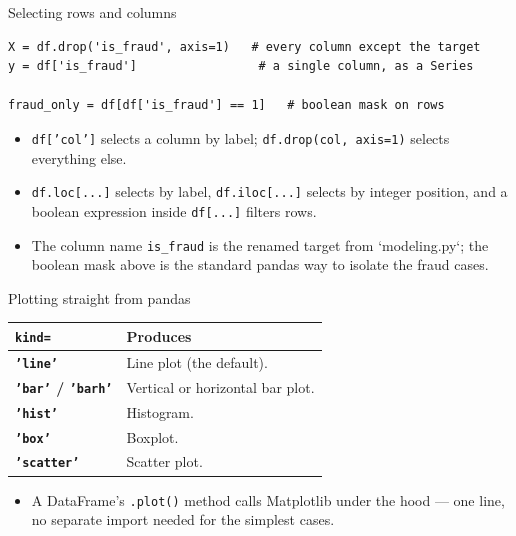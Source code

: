 \begin{frame}[fragile]{Selecting rows and columns}
\begin{lstlisting}[style=coursepython]
X = df.drop('is_fraud', axis=1)   # every column except the target
y = df['is_fraud']                 # a single column, as a Series

fraud_only = df[df['is_fraud'] == 1]   # boolean mask on rows
\end{lstlisting}
\begin{itemize}
\item \texttt{df['col']} selects a column by label; \texttt{df.drop(col, axis=1)} selects everything else.
\item \texttt{df.loc[...]} selects by label, \texttt{df.iloc[...]} selects by integer position, and a boolean expression inside \texttt{df[...]} filters rows.
\item The column name \texttt{is\_fraud} is the renamed target from `modeling.py`; the boolean mask above is the standard pandas way to isolate the fraud cases.
\end{itemize}
\coursefooter
\end{frame}

\begin{frame}{Plotting straight from pandas}
\begin{tabularx}{\textwidth}{>{\bfseries}l X}
\texttt{kind=} & Produces \\
\toprule
\texttt{'line'} & Line plot (the default). \\
\texttt{'bar'} / \texttt{'barh'} & Vertical or horizontal bar plot. \\
\texttt{'hist'} & Histogram. \\
\texttt{'box'} & Boxplot. \\
\texttt{'scatter'} & Scatter plot. \\
\bottomrule
\end{tabularx}
\vspace{0.4em}
\begin{itemize}
\item A DataFrame's \texttt{.plot()} method calls Matplotlib under the hood --- one line, no separate import needed for the simplest cases.
\end{itemize}
\coursefooter
\end{frame}

